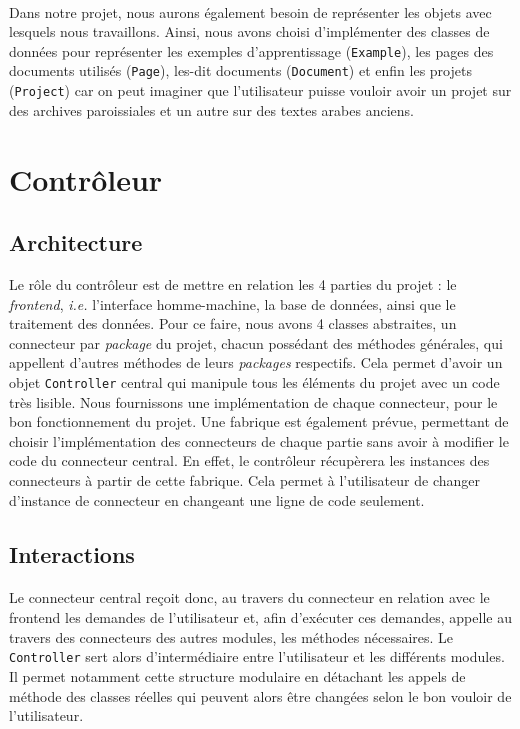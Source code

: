 \paragraph{}
Dans notre projet, nous aurons également besoin de représenter les objets avec lesquels nous travaillons. Ainsi, nous avons choisi d'implémenter des classes de données pour représenter les exemples d'apprentissage (\texttt{Example}), les pages des documents utilisés (\texttt{Page}), les-dit documents (\texttt{Document}) et enfin les projets (\texttt{Project}) car on peut imaginer que l'utilisateur puisse vouloir avoir un projet sur des archives paroissiales et un autre sur des textes arabes anciens.


\section{Contrôleur}
\subsection{Architecture}

Le rôle du contrôleur est de mettre en relation les 4 parties du projet : le \textit{frontend}, \textit{i.e.} l'interface homme-machine, la base de données, ainsi que le traitement des données. Pour ce faire, nous avons 4 classes abstraites, un connecteur par \textit{package} du projet, chacun possédant des méthodes générales, qui appellent d'autres méthodes de leurs \textit{packages} respectifs. Cela permet d'avoir un objet \texttt{Controller} central qui manipule tous les éléments du projet avec un code très lisible. Nous fournissons une implémentation de chaque connecteur, pour le bon fonctionnement du projet. Une fabrique est également prévue, permettant de choisir l'implémentation des connecteurs de chaque partie sans avoir à modifier le code du connecteur central. En effet, le contrôleur récupèrera les instances des connecteurs à partir de cette fabrique. Cela permet à l'utilisateur de changer d'instance de connecteur en changeant une ligne de code seulement.

\subsection{Interactions}
\paragraph{}
Le connecteur central reçoit donc, au travers du connecteur en relation avec le frontend les demandes de l'utilisateur et, afin d'exécuter ces demandes, appelle au travers des connecteurs des autres modules, les méthodes nécessaires. Le \texttt{Controller} sert alors d'intermédiaire entre l'utilisateur et les différents modules. Il permet notamment cette structure modulaire en détachant les appels de méthode des classes réelles qui peuvent alors être changées selon le bon vouloir de l'utilisateur.

